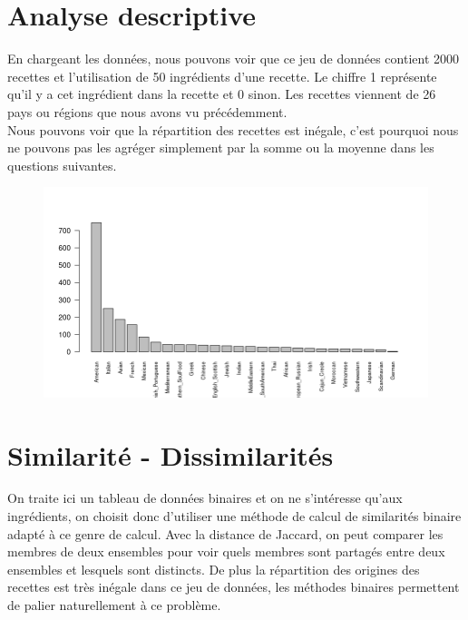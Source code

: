 \documentclass[a4paper, titlepage]{report}
\begin{document}
\section{Analyse descriptive}

En chargeant les données, nous pouvons voir que ce jeu de données contient 2000 recettes et l'utilisation de 50 ingrédients d'une recette. Le chiffre 1 représente qu'il y a cet ingrédient dans la recette et 0 sinon. Les recettes viennent de 26 pays ou régions que nous avons vu précédemment.\\
\indent Nous pouvons voir que la répartition des recettes est inégale, c'est pourquoi nous ne pouvons pas les agréger simplement par la somme ou la moyenne dans les questions suivantes.

\begin{figure}[h]
	\begin{center}
		\includegraphics[scale = 0.32]{./doc/nombre-recettes.png}
	\end{center}
\end{figure}

\section{Similarité - Dissimilarités}

On traite ici un tableau de données binaires et on ne s’intéresse qu'aux ingrédients, on choisit donc d'utiliser une méthode de calcul de similarités binaire adapté à ce genre de calcul. Avec la distance de Jaccard, on peut comparer les membres de deux ensembles pour voir quels membres sont partagés entre deux ensembles et lesquels sont distincts. De plus la répartition des origines des recettes est très inégale dans ce jeu de données, les méthodes binaires permettent de palier naturellement à ce problème.
\end{document}
